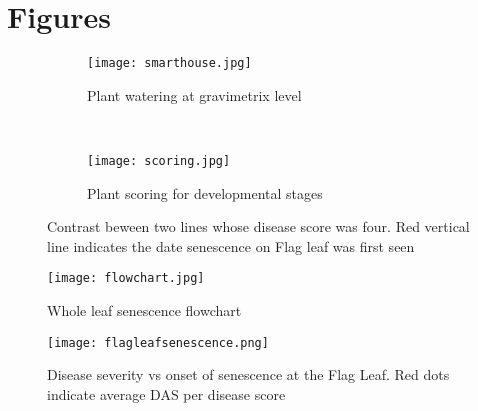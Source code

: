 \documentclass{frontiersSCNS} %
\begin{document}

\section*{Figures}


\begin{figure}
    \begin{center}
    \begin{subfigure}[b]{0.5\textwidth}
        \texttt{[image: smarthouse.jpg]}
        \caption{Plant watering at gravimetrix level}
    \end{subfigure}
    ~ %
    \begin{subfigure}[b]{0.5\textwidth}
        \texttt{[image: scoring.jpg]}
        \caption{Plant scoring for developmental stages}
    \end{subfigure}
\end{center}
    \caption{Contrast beween two lines whose disease score was four. Red vertical line indicates the date senescence on Flag leaf was first seen}\label{fig3}
\end{figure}


\begin{figure}[h!]
\begin{center}
\texttt{[image: flowchart.jpg]}
\end{center}
 \caption{ Whole leaf senescence flowchart}\label{fig1:flowchart}
\end{figure}

\begin{figure}[h!]
\begin{center}
\texttt{[image: flagleafsenescence.png]}
\end{center}
 \caption{Disease severity vs onset of senescence at the Flag Leaf. Red dots indicate average DAS per disease score}\label{fig2}
\end{figure}
\end{document}
